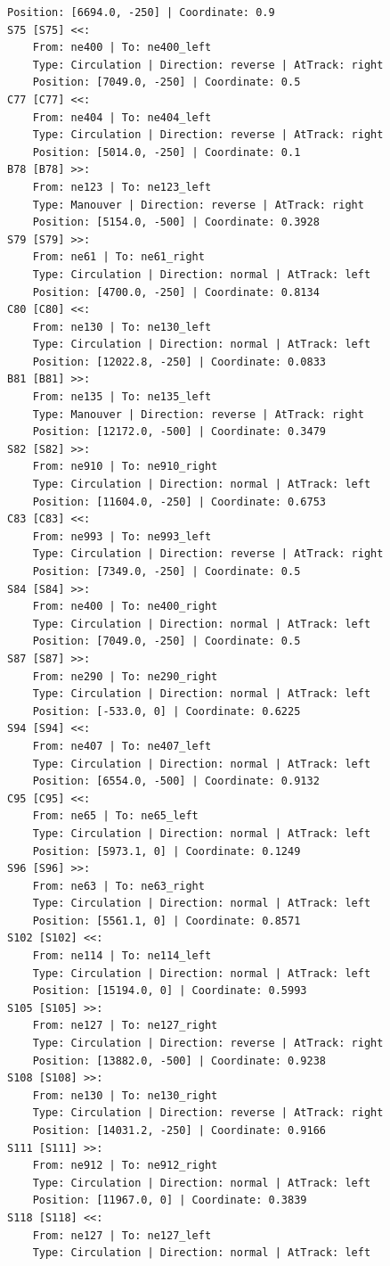 \begin{lstlisting}[language = {}, tabsize=4, basicstyle=\footnotesize\ttfamily, showspaces=false, showstringspaces=false, caption = Signalling.RNA, label = {lst:EJ4_6}]
	Position: [6694.0, -250] | Coordinate: 0.9
S75 [S75] <<:
	From: ne400 | To: ne400_left
	Type: Circulation | Direction: reverse | AtTrack: right 
	Position: [7049.0, -250] | Coordinate: 0.5
C77 [C77] <<:
	From: ne404 | To: ne404_left
	Type: Circulation | Direction: reverse | AtTrack: right 
	Position: [5014.0, -250] | Coordinate: 0.1
B78 [B78] >>:
	From: ne123 | To: ne123_left
	Type: Manouver | Direction: reverse | AtTrack: right 
	Position: [5154.0, -500] | Coordinate: 0.3928
S79 [S79] >>:
	From: ne61 | To: ne61_right
	Type: Circulation | Direction: normal | AtTrack: left 
	Position: [4700.0, -250] | Coordinate: 0.8134
C80 [C80] <<:
	From: ne130 | To: ne130_left
	Type: Circulation | Direction: normal | AtTrack: left 
	Position: [12022.8, -250] | Coordinate: 0.0833
B81 [B81] >>:
	From: ne135 | To: ne135_left
	Type: Manouver | Direction: reverse | AtTrack: right 
	Position: [12172.0, -500] | Coordinate: 0.3479
S82 [S82] >>:
	From: ne910 | To: ne910_right
	Type: Circulation | Direction: normal | AtTrack: left 
	Position: [11604.0, -250] | Coordinate: 0.6753
C83 [C83] <<:
	From: ne993 | To: ne993_left
	Type: Circulation | Direction: reverse | AtTrack: right 
	Position: [7349.0, -250] | Coordinate: 0.5
S84 [S84] >>:
	From: ne400 | To: ne400_right
	Type: Circulation | Direction: normal | AtTrack: left 
	Position: [7049.0, -250] | Coordinate: 0.5
S87 [S87] >>:
	From: ne290 | To: ne290_right
	Type: Circulation | Direction: normal | AtTrack: left 
	Position: [-533.0, 0] | Coordinate: 0.6225
S94 [S94] <<:
	From: ne407 | To: ne407_left
	Type: Circulation | Direction: normal | AtTrack: left 
	Position: [6554.0, -500] | Coordinate: 0.9132
C95 [C95] <<:
	From: ne65 | To: ne65_left
	Type: Circulation | Direction: normal | AtTrack: left 
	Position: [5973.1, 0] | Coordinate: 0.1249
S96 [S96] >>:
	From: ne63 | To: ne63_right
	Type: Circulation | Direction: normal | AtTrack: left 
	Position: [5561.1, 0] | Coordinate: 0.8571
S102 [S102] <<:
	From: ne114 | To: ne114_left
	Type: Circulation | Direction: normal | AtTrack: left 
	Position: [15194.0, 0] | Coordinate: 0.5993
S105 [S105] >>:
	From: ne127 | To: ne127_right
	Type: Circulation | Direction: reverse | AtTrack: right 
	Position: [13882.0, -500] | Coordinate: 0.9238
S108 [S108] >>:
	From: ne130 | To: ne130_right
	Type: Circulation | Direction: reverse | AtTrack: right 
	Position: [14031.2, -250] | Coordinate: 0.9166
S111 [S111] >>:
	From: ne912 | To: ne912_right
	Type: Circulation | Direction: normal | AtTrack: left 
	Position: [11967.0, 0] | Coordinate: 0.3839
S118 [S118] <<:
	From: ne127 | To: ne127_left
	Type: Circulation | Direction: normal | AtTrack: left 

\end{lstlisting}
